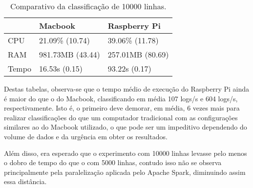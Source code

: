 \begin{table}[!ht]
    \centering
    \begin{tabular}{|l|l|l|}
    \hline
        ~ & Macbook & Raspberry Pi \\ \hline
        CPU & 21.09\% (10.74) & 39.06\% (11.78) \\ \hline
        RAM & 981.73MB (43.44) & 257.01MB (80.69) \\ \hline
        Tempo & 16.53s (0.15) & 93.22s (0.17) \\ \hline
    \end{tabular}

    \caption{Comparativo da classificação de 10000 linhas.\label{tab:comparativo_classificacao_10000}}
\end{table}


Destas tabelas, observa-se que o tempo médio de execução do Raspberry Pi ainda é maior 
do que o do Macbook, classificando em média 107 logs/s e 604 logs/s, respectivamente. Isto é,
o primeiro deve demorar, em média, 6 vezes mais para realizar classificações do que um computador tradicional 
com as configurações similares ao do Macbook utilizado, o que pode ser um impeditivo dependendo do 
volume de dados e da urgência em obter os resultados.

Além disso, era esperado que o experimento com 10000 linhas levasse pelo menos o dobro de tempo
do que o com 5000 linhas, contudo isso não se observa principalmente pela paralelização 
aplicada pelo Apache Spark, diminuindo assim essa distância.